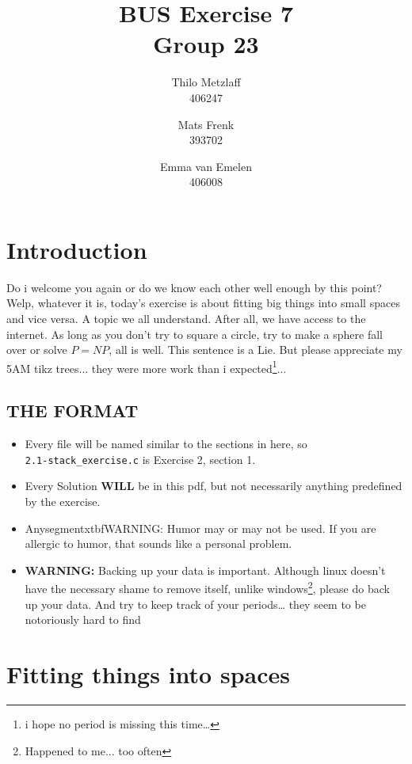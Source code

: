 \documentclass[a4paper, 11pt]{article}
\author{Thilo Metzlaff\\406247 \and Mats Frenk\\393702\and Emma van Emelen\\406008}
\title{BUS Exercise 7 \\ Group 23}
\begin{document}
    \maketitle
    \newpage

    \tableofcontents
    \newpage

    \section*{Introduction}
    Do i welcome you again or do we know each other well enough by this point? Welp, whatever it is, today's exercise is about fitting big things into small spaces and vice versa.
    A topic we all understand. After all, we have access to the internet. As long as you don't try to square a circle, try to make a sphere fall over or solve $P=NP$, all is well.
    This sentence is a Lie. But please appreciate my 5AM tikz trees... they were more work than i expected\footnote{i hope no period is missing this time\dots}... 

    \subsection*{THE FORMAT}
    \begin{itemize}
      \item Every file will be named similar to the sections in here, so\\
      \texttt{2.1-stack\_exercise.c} is Exercise 2, section 1.
      \item Every Solution \textbf{WILL} be in this pdf, but not necessarily 
            anything predefined by the exercise.
      \item Anysegmentxtbf{WARNING:} Humor may or may not be used. If you are allergic
            to humor, that sounds like a personal problem.
      \item \textbf{WARNING:} Backing up your data is important. Although linux 
            doesn't have the necessary shame to remove itself, unlike windows\footnote{Happened to me... too often},
            please do back up your data. And try to keep track of your periods\dots
            they seem to be notoriously hard to find
    \end{itemize}
    \newpage
    
    \section{Fitting things into spaces}
\end{document}
